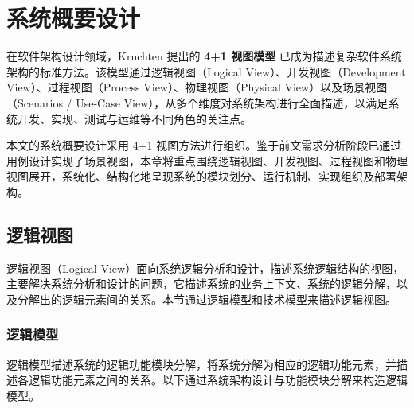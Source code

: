 
\chapter{系统概要设计}
    在软件架构设计领域，Kruchten \cite{Kruchten1995} 提出的 \textbf{4+1 视图模型} 已成为描述复杂软件系统架构的标准方法。该模型通过逻辑视图（Logical View）、开发视图（Development View）、过程视图（Process View）、物理视图（Physical View）以及场景视图（Scenarios / Use-Case View），从多个维度对系统架构进行全面描述，以满足系统开发、实现、测试与运维等不同角色的关注点。

    本文的系统概要设计采用 4+1 视图方法进行组织。鉴于前文需求分析阶段已通过用例设计实现了场景视图，本章将重点围绕逻辑视图、开发视图、过程视图和物理视图展开，系统化、结构化地呈现系统的模块划分、运行机制、实现组织及部署架构。

\section{逻辑视图}
    逻辑视图（Logical View）面向系统逻辑分析和设计，描述系统逻辑结构的视图，主要解决系统分析和设计的问题，它描述系统的业务上下文、系统的逻辑分解，以及分解出的逻辑元素间的关系。本节通过逻辑模型和技术模型来描述逻辑视图。

\subsection{逻辑模型}
    逻辑模型描述系统的逻辑功能模块分解，将系统分解为相应的逻辑功能元素，并描述各逻辑功能元素之间的关系。以下通过系统架构设计与功能模块分解来构造逻辑模型。

